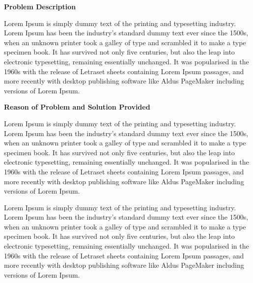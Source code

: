\documentclass{article}
\begin{document}
\vspace{1em}
\newpage

\begin{center}
    \textbf{Problem Description}
\end{center}

\vspace{1em}
Lorem Ipsum is simply dummy text of the printing and typesetting industry. Lorem Ipsum has been the industry's standard dummy text ever since the 1500s, when an unknown printer took a galley of type and scrambled it to make a type specimen book. It has survived not only five centuries, but also the leap into electronic typesetting, remaining essentially unchanged. It was popularised in the 1960s with the release of Letraset sheets containing Lorem Ipsum passages, and more recently with desktop publishing software like Aldus PageMaker including versions of Lorem Ipsum.

\vspace{1em}

\begin{center}
    \textbf{Reason of Problem and Solution Provided}
\end{center}

\vspace{1em}
Lorem Ipsum is simply dummy text of the printing and typesetting industry. Lorem Ipsum has been the industry's standard dummy text ever since the 1500s, when an unknown printer took a galley of type and scrambled it to make a type specimen book. It has survived not only five centuries, but also the leap into electronic typesetting, remaining essentially unchanged. It was popularised in the 1960s with the release of Letraset sheets containing Lorem Ipsum passages, and more recently with desktop publishing software like Aldus PageMaker including versions of Lorem Ipsum.

Lorem Ipsum is simply dummy text of the printing and typesetting industry. Lorem Ipsum has been the industry's standard dummy text ever since the 1500s, when an unknown printer took a galley of type and scrambled it to make a type specimen book. It has survived not only five centuries, but also the leap into electronic typesetting, remaining essentially unchanged. It was popularised in the 1960s with the release of Letraset sheets containing Lorem Ipsum passages, and more recently with desktop publishing software like Aldus PageMaker including versions of Lorem Ipsum.

\vspace{1em}
\end{document}
